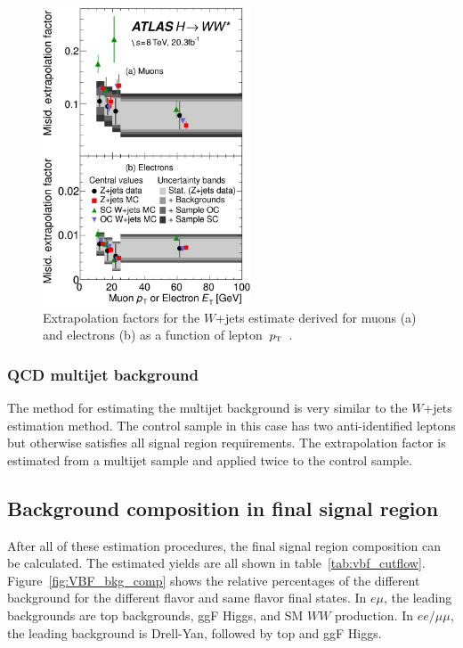\begin{figure}[h!]
  \centering
  \captionsetup{justification=centering}
  \includegraphics[width=0.55\textwidth]{figures/VBF_Wjets_extrap}
  \caption{Extrapolation factors for the $W$+jets estimate derived for muons (a) and electrons (b) as a function of lepton~$p_{\textrm{\footnotesize\sc t}}$~\cite{WW2015}.}
  \label{fig:VBF_extrap_Wjets}
\end{figure}

\subsubsection{QCD multijet background}

The method for estimating the multijet background is very similar to the $W$+jets estimation method. The control sample in this case has two anti-identified leptons but otherwise satisfies all signal region requirements. The extrapolation factor is estimated from a multijet sample and applied twice to the control sample. 

\subsection{Background composition in final signal region}

After all of these estimation procedures, the final signal region composition can be calculated. The estimated yields are all shown in table~\ref{tab:vbf_cutflow}. Figure~\ref{fig:VBF_bkg_comp} shows the relative percentages of the different background for the different flavor and same flavor final states. In $e\mu$, the leading backgrounds are top backgrounds, ggF Higgs, and SM $WW$ production. In $ee/\mu\mu$, the leading background is Drell-Yan, followed by top and ggF Higgs.


